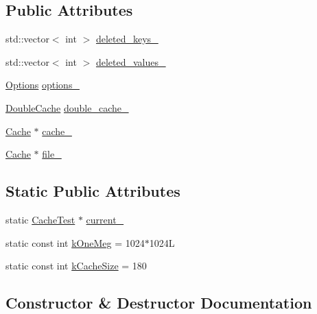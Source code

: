 \subsection*{Public Attributes}
\begin{DoxyCompactItemize}
\item 
std\+::vector$<$ int $>$ \hyperlink{classleveldb_1_1_cache_test_a2a2b062e2e77ece15b5ac35bf44a0718}{deleted\+\_\+keys\+\_\+}
\item 
std\+::vector$<$ int $>$ \hyperlink{classleveldb_1_1_cache_test_aeafe117c5ac50ccb9eecfc31069bb35e}{deleted\+\_\+values\+\_\+}
\item 
\hyperlink{structleveldb_1_1_options}{Options} \hyperlink{classleveldb_1_1_cache_test_af0e716deccf8122f37eeffbd7a330971}{options\+\_\+}
\item 
\hyperlink{classleveldb_1_1_double_cache}{Double\+Cache} \hyperlink{classleveldb_1_1_cache_test_a587eae8d58dc303aa992e0ed67bdbbc6}{double\+\_\+cache\+\_\+}
\item 
\hyperlink{classleveldb_1_1_cache}{Cache} $\ast$ \hyperlink{classleveldb_1_1_cache_test_ac53f6c47ee88f43cee01024df1045671}{cache\+\_\+}
\item 
\hyperlink{classleveldb_1_1_cache}{Cache} $\ast$ \hyperlink{classleveldb_1_1_cache_test_a8dc10cbcdcac090927837546c72e315a}{file\+\_\+}
\end{DoxyCompactItemize}
\subsection*{Static Public Attributes}
\begin{DoxyCompactItemize}
\item 
static \hyperlink{classleveldb_1_1_cache_test}{Cache\+Test} $\ast$ \hyperlink{classleveldb_1_1_cache_test_a91ef57f644d0531b882caed9547759f6}{current\+\_\+}
\item 
static const int \hyperlink{classleveldb_1_1_cache_test_ab9e37a17f7cfcf7397e912af9a263440}{k\+One\+Meg} = 1024$\ast$1024\+L
\item 
static const int \hyperlink{classleveldb_1_1_cache_test_a1e4cd6b55746670711d7f57d9432b3d6}{k\+Cache\+Size} = 180
\end{DoxyCompactItemize}


\subsection{Constructor \& Destructor Documentation}
\hypertarget{classleveldb_1_1_cache_test_abfea0e2ae3ee11b62d1f6b622ef47334}{}
